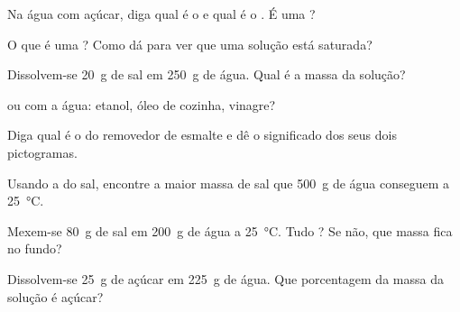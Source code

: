 \begin{exercise}[$\star$]\label{exo:g6:solutions-and-solubility:1}
Na água com açúcar, diga qual é o  e qual é o . É uma
?
\end{exercise}

\begin{exercise}[$\star$]\label{exo:g6:solutions-and-solubility:2}
O que é uma ? Como dá para ver que uma solução está
saturada?
\end{exercise}

\begin{exercise}[$\star$]\label{exo:g6:solutions-and-solubility:3}
Dissolvem-se \qty{20}{g} de sal em \qty{250}{g} de água. Qual é a massa
da solução?
\end{exercise}

\begin{exercise}[$\star$]\label{exo:g6:solutions-and-solubility:4}
 ou  com a água: etanol, óleo de cozinha, vinagre?
\end{exercise}

\begin{exercise}[$\star$]\label{exo:g6:solutions-and-solubility:5}
Diga qual é o  do removedor de esmalte e dê o significado dos
seus dois pictogramas.
\end{exercise}

\begin{exercise}[$\star\star$]\label{exo:g6:solutions-and-solubility:6}
Usando a  do sal, encontre a maior massa de sal que
\qty{500}{g} de água conseguem  a \qty{25}{\celsius}.
\end{exercise}

\begin{exercise}[$\star\star$]\label{exo:g6:solutions-and-solubility:7}
Mexem-se \qty{80}{g} de sal em \qty{200}{g} de água a
\qty{25}{\celsius}. Tudo ? Se não, que massa fica no fundo?
\end{exercise}

\begin{exercise}[$\star\star$]\label{exo:g6:solutions-and-solubility:8}
Dissolvem-se \qty{25}{g} de açúcar em \qty{225}{g} de água. Que
porcentagem da massa da solução é açúcar?
\end{exercise}

